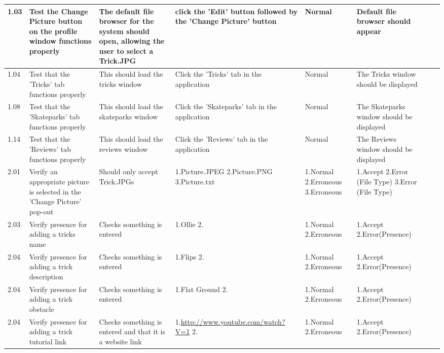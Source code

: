 \begin{landscape}
\begin{center}
\begin{longtable}{|p{1.5cm}|p{2.5cm}|p{2.5cm}|p{2cm}|p{2cm}|p{2cm}|p{2cm}|p{2cm}|}
1.03 & Test the Change Picture button on the profile window functions properly &  The default file browser for the system should open, allowing the user to select a Trick.JPG & click the 'Edit' button followed by the 'Change Picture' button & Normal & Default file browser should appear & &\\ \hline



1.04 & Test that the 'Tricks' tab functions properly & This should load the tricks window & Click the 'Tricks' tab in the application & Normal & The Tricks window should be displayed & & \\ \hline



1.08 & Test that the 'Skateparks' tab functions properly & This should load the skateparks window &Click the 'Skateparks' tab in the application & Normal & The Skateparks window should be displayed & & \\ \hline


1.14 & Test that the 'Reviews' tab functions properly & This should load the reviews window & Click the 'Reviews' tab in the application & Normal & The Reviews window should be displayed & &  \\ \hline



2.01 & Verify an appropriate picture is selected in the 'Change Picture' pop-out & Should only accept Trick.JPGs & 1.Picture.JPEG 2.Picture.PNG 3.Picture.txt & 1.Normal 2.Erroneous 3.Erroneous & 1.Accept 2.Error (File Type) 3.Error (File Type) & & \\ \hline


2.03 & Verify presence for adding a tricks name & Checks something is entered & 1.Ollie 2.  & 1.Normal 2.Erroneous & 1.Accept 2.Error(Presence) & & \\ \hline

2.04 & Verify presence for adding a trick description & Checks something is entered & 1.Flips 2. & 1.Normal 2.Erroneous & 1.Accept 2.Error(Presence) & & \\ \hline

2.04 & Verify presence for adding a trick obstacle & Checks something is entered & 1.Flat Ground 2. & 1.Normal 2.Erroneous & 1.Accept 2.Error(Presence) & & \\ \hline

2.04 & Verify presence for adding a trick tutorial link & Checks something is entered and that it is a website link & 1.\url{http://www.youtube.com/watch?V=1} 2. & 1.Normal 2.Erroneous & 1.Accept 2.Error(Presence) & & \\ \hline


\end{longtable}
\end{center}
\end{landscape}
